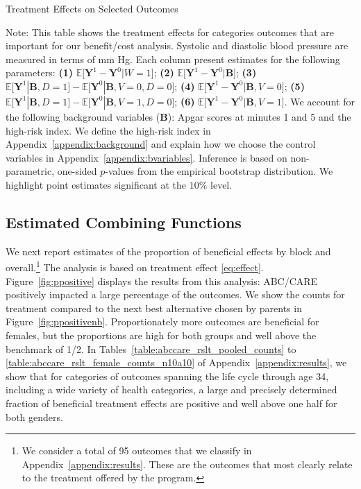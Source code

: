 \begin{table}[!htbp]
\centering
\begin{threeparttable}
\caption{Treatment Effects on Selected Outcomes}\label{table:tescombined}
\begin{scriptsize}

\end{scriptsize}
\begin{tablenotes}
\tiny
Note: This table shows the treatment effects for categories outcomes that are important for our benefit/cost analysis. Systolic and diastolic blood pressure are measured in terms of mm Hg. Each column present estimates for the following parameters: \textbf{(1)} $\mathbb{E} \big[ \bm{Y}^1 - \bm{Y}^0 | W = 1]$; {\textbf{(2)} $\mathbb{E} \big[ \bm{Y}^1 - \bm{Y}^0 | \bm{B} \big]$}; {\textbf{(3)} $\mathbb{E} \big[ \bm{Y}^1 | \bm{B}, D=1 \big] - \mathbb{E} \big[ \bm{Y}^0 | \bm{B}, V=0, D=0 \big]$}; {\textbf{(4)} $\mathbb{E} \big[ \bm{Y}^1 - \bm{Y}^0 | \bm{B}, V=0 \big] $}; {\textbf{(5)} $\mathbb{E} \big[ \bm{Y}^1 | \bm{B}, D=1 \big] - \mathbb{E} \big[ \bm{Y}^0 | \bm{B}, V=1, D = 0 \big]$}; {\textbf{(6)} $\mathbb{E} \big[ \bm{Y}^1 - \bm{Y}^0 | \bm{B}, V=1 \big]$}. We account for the following background variables ($\bm{B}$): Apgar scores at minutes 1 and 5 and the high-risk index. We define the high-risk index in Appendix~\ref{appendix:background} and explain how we choose the control variables in Appendix~\ref{appendix:bvariables}. Inference is based on non-parametric, one-sided $p$-values from the empirical bootstrap distribution. We highlight point estimates significant at the $10\%$ level.
\end{tablenotes}
\end{threeparttable}
\end{table}
\restoregeometry
\doublespacing

\subsection{Estimated Combining Functions}

We next report estimates of the proportion of beneficial effects by block and overall.\footnote{We consider a total of 95 outcomes that we classify in Appendix~\ref{appendix:results}. These are the outcomes that most clearly relate to the treatment offered by the program.} The analysis is based on treatment effect \eqref{eq:effect}. Figure~\ref{fig:ppositive} displays the results from this analysis: ABC/CARE positively impacted a large percentage of the outcomes. We show the counts for treatment compared to the next best alternative chosen by parents in Figure~\ref{fig:ppositivenb}. Proportionately more outcomes are beneficial for females, but the proportions are high for both groups and well above the benchmark of 1/2. In Tables~\ref{table:abccare_rslt_pooled_counts} to \ref{table:abccare_rslt_female_counts_n10a10} of Appendix~\ref{appendix:results}, we show that for categories of outcomes spanning the life cycle through age 34, including a wide variety of health categories, a large and precisely determined fraction of beneficial treatment effects are positive and well above one half for both genders.

